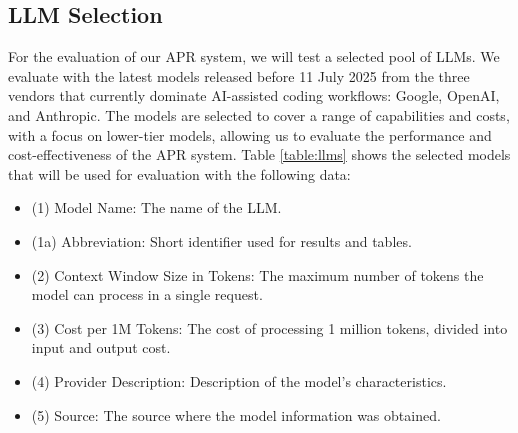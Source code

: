 \subsection{LLM Selection} \label{subsection:llm-selection}
For the evaluation of our APR system, we will test a selected pool of \acp{LLM}. We evaluate with the latest models released before 11 July 2025 from the three vendors that currently dominate AI-assisted coding workflows: Google, OpenAI, and Anthropic. The models are selected to cover a range of capabilities and costs, with a focus on lower-tier models, allowing us to evaluate the performance and cost-effectiveness of the APR system. Table \ref{table:llms} shows the selected models that will be used for evaluation with the following data:
\begin{itemize}
    \item (1) Model Name: The name of the \ac{LLM}.
    \item (1a) Abbreviation: Short identifier used for results and tables.
    \item (2) Context Window Size in Tokens: The maximum number of tokens the model can process in a single request.
    \item (3) Cost per 1M Tokens: The cost of processing 1 million tokens, divided into input and output cost.
    \item (4) Provider Description: Description of the model's characteristics.
    \item (5) Source: The source where the model information was obtained.
\end{itemize}

